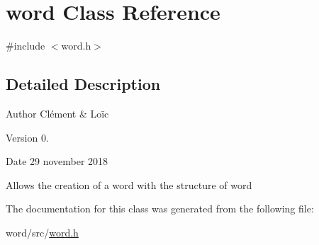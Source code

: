\hypertarget{classword}{}\section{word Class Reference}
\label{classword}


{\ttfamily \#include $<$word.\+h$>$}



\subsection{Detailed Description}
\begin{DoxyAuthor}{Author}
Clément \& Loïc 
\end{DoxyAuthor}
\begin{DoxyVersion}{Version}
0. 
\end{DoxyVersion}
\begin{DoxyDate}{Date}
29 november 2018
\end{DoxyDate}
Allows the creation of a word with the structure of \textquotesingle{}word\textquotesingle{} 

The documentation for this class was generated from the following file\+:\begin{DoxyCompactItemize}
\item 
word/src/\mbox{\hyperlink{word_8h}{word.\+h}}\end{DoxyCompactItemize}
